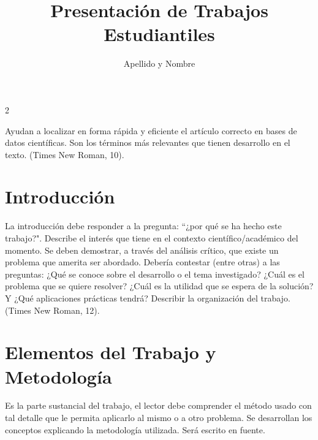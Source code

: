 


\author{Apellido y Nombre}
\title{Presentación de Trabajos Estudiantiles}


\titulo

\begin{multicols}{2}



{\footnotesize
Ayudan a localizar en forma rápida y eficiente el artículo correcto en bases de datos científicas. Son los términos más relevantes que tienen desarrollo en el \cite{m_asiri_hybrid_2023} texto. (Times New Roman, 10).
\par}

\section{Introducción}

La introducción debe responder a la pregunta: “¿por qué se ha hecho este trabajo?". Describe el interés que tiene en el contexto científico/académico del momento. Se deben demostrar, a través del análisis crítico, que existe un problema que amerita ser abordado. Debería contestar (entre otras) a las preguntas: ¿Qué se conoce sobre el desarrollo o el tema investigado? ¿Cuál es el problema que se quiere resolver? ¿Cuál es la utilidad que se espera de la solución? Y ¿Qué aplicaciones prácticas tendrá? Describir la organización del trabajo. (Times New Roman, 12).

\section{Elementos del Trabajo y Metodología}

Es la parte sustancial del trabajo, el lector debe comprender el método usado con tal detalle que le permita aplicarlo al mismo o a otro problema. Se desarrollan los conceptos explicando la metodología utilizada. Será escrito en fuente.


\end{multicols}
